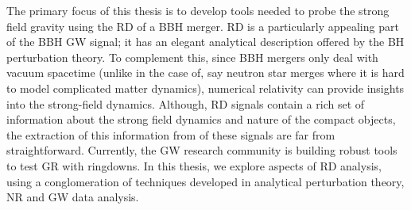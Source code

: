 The primary focus of this thesis is to develop tools needed to probe the strong field gravity using the RD of a BBH merger. RD is a particularly appealing part of the BBH GW signal; it has an elegant analytical description offered by the BH  perturbation theory. To complement this,  since BBH mergers only deal with vacuum spacetime (unlike in the case of, say neutron star merges where it is hard to model complicated matter dynamics), numerical relativity can provide insights into the strong-field dynamics. Although, RD signals contain a rich set of information about the strong field dynamics and nature of the compact objects, the extraction of this information from of these signals are far from straightforward. Currently, the GW research community is building robust tools to test GR with ringdowns. In this thesis, we explore aspects of RD analysis,  using a conglomeration of techniques developed in analytical perturbation theory, NR and GW data analysis. 









